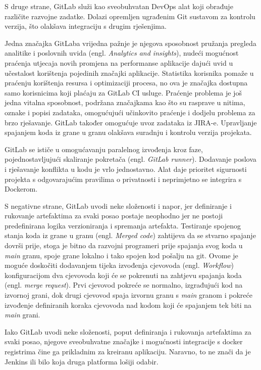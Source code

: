 \documentclass[a4paper,12pt,oneside]{article}
\begin{document}
S druge strane, GitLab služi kao sveobuhvatan DevOps alat koji obrađuje različite razvojne zadatke. Dolazi opremljen ugrađenim Git sustavom za kontrolu verzija, što olakšava integraciju s drugim rješenjima.

Jedna značajka GitLaba vrijedna pažnje je njegova sposobnost pružanja pregleda analitike i poslovnih uvida (engl. \textit{Analytics and insights}), nudeći mogućnost praćenja utjecaja novih promjena na performanse aplikacije dajući uvid u učestalost korištenja pojedinih značajki aplikacije. Statistika korisnika pomaže u praćenju korištenja resursa i optimizaciji procesa, no ova je značajka dostupna samo korisnicima koji plaćaju za GitLab CI usluge. Praćenje problema je još jedna vitalna sposobnost, podržana značajkama kao što su rasprave u nitima, oznake i popisi zadataka, omogućujući učinkovito praćenje i dodjelu problema za brzo rješavanje. GitLab također omogućuje uvoz zadataka iz JIRA-e. Upravljanje spajanjem koda iz grane u granu olakšava suradnju i kontrolu verzija projekata.

GitLab se ističe u omogućavanju paralelnog izvođenja kroz faze, pojednostavljujući skaliranje pokretača (engl. \textit{GitLab runner}). Dodavanje poslova i rješavanje konflikta u kodu je vrlo jednostavno. Alat daje prioritet sigurnosti projekta s odgovarajućim pravilima o privatnosti i neprimjetno se integrira s Dockerom.

S negativne strane, GitLab uvodi neke složenosti i napor, jer definiranje i rukovanje artefaktima za svaki posao postaje neophodno jer ne postoji predefinirana logika verzioniranja i spremanja artefakta. Testiranje spojenog stanja koda iz grane u granu (engl. \textit{Merged code}) zahtijeva da se stvarno spajanje dovrši prije, stoga je bitno da razvojni programeri prije spajanja svog koda u \textit{main} granu, spoje grane lokalno i tako spojen kod pošalju na git. Ovome je moguće doskočiti dodavanjem tijeka izvođenja cjevovoda (engl. \textit{Workflow}) konfiguracijom dva cjevovoda koji će se pokrenuti na zahtjevu spajanja koda (engl. \textit{merge request}). Prvi cjevovod pokreće se normalno, izgrađujući kod na izvornoj grani, dok drugi cjevovod spaja izvornu granu s \textit{main} granom i pokreće izvođenje definiranih koraka cjevovoda nad kodom koji će spajanjem tek biti na \textit{main} grani.

Iako GitLab uvodi neke složenosti, poput definiranja i rukovanja artefaktima za svaki posao, njegove sveobuhvatne značajke i mogućnosti integracije s docker registrima čine ga prikladnim za kreiranu aplikaciju. Naravno, to ne znači da je Jenkins ili bilo koja druga platforma lošiji odabir.
\end{document}
